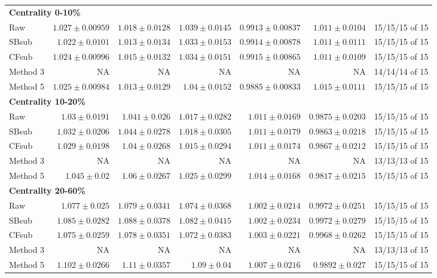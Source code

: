 \documentclass[10pt,a4paper]{article}
\begin{document}
{\begin{longtable}{lrrrrrl}
\hline
\multicolumn{7}{l}{\textbf{Centrality 0-10\%}}\\
Raw & $1.027\pm0.00959$ & $1.018\pm0.0128$ & $1.039\pm0.0145$ & $0.9913\pm0.00837$ & $1.011\pm0.0104$ & 15/15/15 of 15\\
SBsub & $1.022\pm0.0101$ & $1.013\pm0.0134$ & $1.033\pm0.0153$ & $0.9914\pm0.00878$ & $1.011\pm0.0111$ & 15/15/15 of 15\\
CFsub & $1.024\pm0.00996$ & $1.015\pm0.0132$ & $1.034\pm0.0151$ & $0.9915\pm0.00865$ & $1.011\pm0.0109$ & 15/15/15 of 15\\
Method 3 & NA & NA & NA & NA & NA & 14/14/14 of 15\\
Method 5 & $1.025\pm0.00984$ & $1.013\pm0.0129$ & $1.04\pm0.0152$ & $0.9885\pm0.00833$ & $1.015\pm0.0111$ & 15/15/15 of 15\\
\hline
\multicolumn{7}{l}{\textbf{Centrality 10-20\%}}\\
Raw & $1.03\pm0.0191$ & $1.041\pm0.026$ & $1.017\pm0.0282$ & $1.011\pm0.0169$ & $0.9875\pm0.0203$ & 15/15/15 of 15\\
SBsub & $1.032\pm0.0206$ & $1.044\pm0.0278$ & $1.018\pm0.0305$ & $1.011\pm0.0179$ & $0.9863\pm0.0218$ & 15/15/15 of 15\\
CFsub & $1.029\pm0.0198$ & $1.04\pm0.0268$ & $1.015\pm0.0294$ & $1.011\pm0.0174$ & $0.9867\pm0.0212$ & 15/15/15 of 15\\
Method 3 & NA & NA & NA & NA & NA & 13/13/13 of 15\\
Method 5 & $1.045\pm0.02$ & $1.06\pm0.0267$ & $1.025\pm0.0299$ & $1.014\pm0.0168$ & $0.9817\pm0.0215$ & 15/15/15 of 15\\
\hline
\multicolumn{7}{l}{\textbf{Centrality 20-60\%}}\\
Raw & $1.077\pm0.025$ & $1.079\pm0.0341$ & $1.074\pm0.0368$ & $1.002\pm0.0214$ & $0.9972\pm0.0251$ & 15/15/15 of 15\\
SBsub & $1.085\pm0.0282$ & $1.088\pm0.0378$ & $1.082\pm0.0415$ & $1.002\pm0.0234$ & $0.9972\pm0.0279$ & 15/15/15 of 15\\
CFsub & $1.075\pm0.0259$ & $1.078\pm0.0351$ & $1.072\pm0.0383$ & $1.003\pm0.0221$ & $0.9968\pm0.0262$ & 15/15/15 of 15\\
Method 3 & NA & NA & NA & NA & NA & 13/13/13 of 15\\
Method 5 & $1.102\pm0.0266$ & $1.11\pm0.0357$ & $1.09\pm0.04$ & $1.007\pm0.0216$ & $0.9892\pm0.027$ & 15/15/15 of 15\\
\hline
\end{longtable}}
\end{document}
